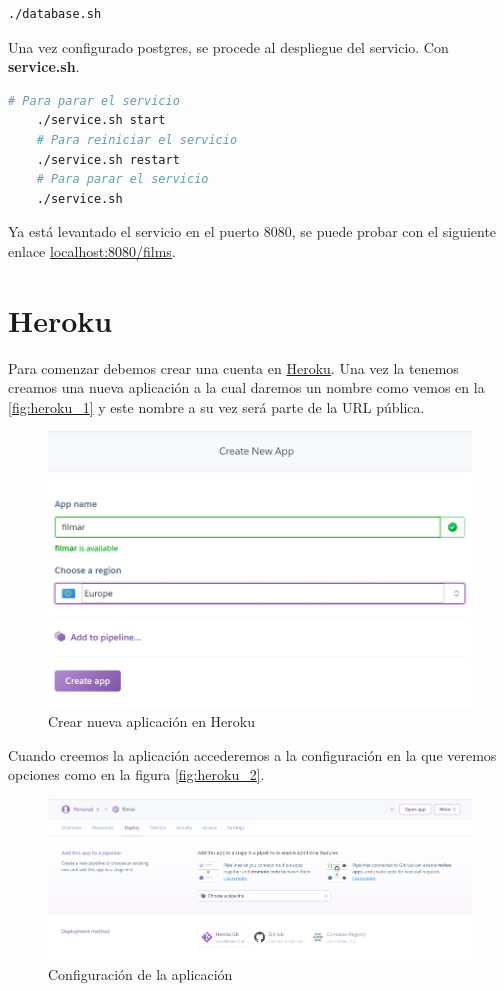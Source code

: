 \begin{lstlisting}[language=bash, caption=Configuración postgresql]
    ./database.sh
\end{lstlisting}

Una vez configurado postgres, se procede al despliegue del servicio. Con \textbf{service.sh}.

\begin{lstlisting}[language=bash, caption=Despliegue]
    # Para parar el servicio
    ./service.sh start
    # Para reiniciar el servicio
    ./service.sh restart
    # Para parar el servicio
    ./service.sh
\end{lstlisting}

Ya está levantado el servicio en el puerto 8080, se puede probar con el siguiente enlace
\url{localhost:8080/films}.

\section{Heroku}
\label{app:heroku}
Para comenzar debemos crear una cuenta en \href{https://www.heroku.com/}{Heroku}.
Una vez la tenemos creamos una nueva aplicación a la
 cual daremos un nombre como vemos en la \autoref{fig:heroku_1} y este
 nombre a su vez será parte de la URL pública.
\begin{figure}[H]
    \centering
    \includegraphics[width=6in]{figures/appendix-A/heroku_1.png}
    \caption{Crear nueva aplicación en Heroku}
    \label{fig:heroku_1}
\end{figure}
Cuando creemos la aplicación accederemos a la configuración en la que veremos
 opciones como en la figura \autoref{fig:heroku_2}.
\begin{figure}[H]
    \centering
    \includegraphics[width=6in]{figures/appendix-A/heroku_2.png}
    \caption{Configuración de la aplicación}
    \label{fig:heroku_2}
\end{figure}
